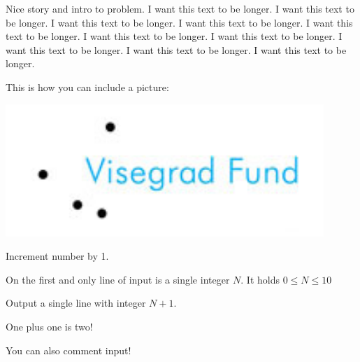 





Nice story and intro to problem.
I want this text to be longer. I want this text to be longer. 
I want this text to be longer. I want this text to be longer. 
I want this text to be longer. I want this text to be longer. 
I want this text to be longer. I want this text to be longer. 
I want this text to be longer. I want this text to be longer.

This is how you can include a picture:

\includegraphics[height=5cm]{img/vsf_logo.jpg}


Increment number by 1.


On the first and only line of input is a single integer $N$.
It holds $0 \leq N \leq 10$


Output a single line with integer $N+1$.



\sampleCOMMENT
One plus one is two!
\sampleEND


\bigskip


\sampleCOMMENT
You can also comment input!
\sampleEND


